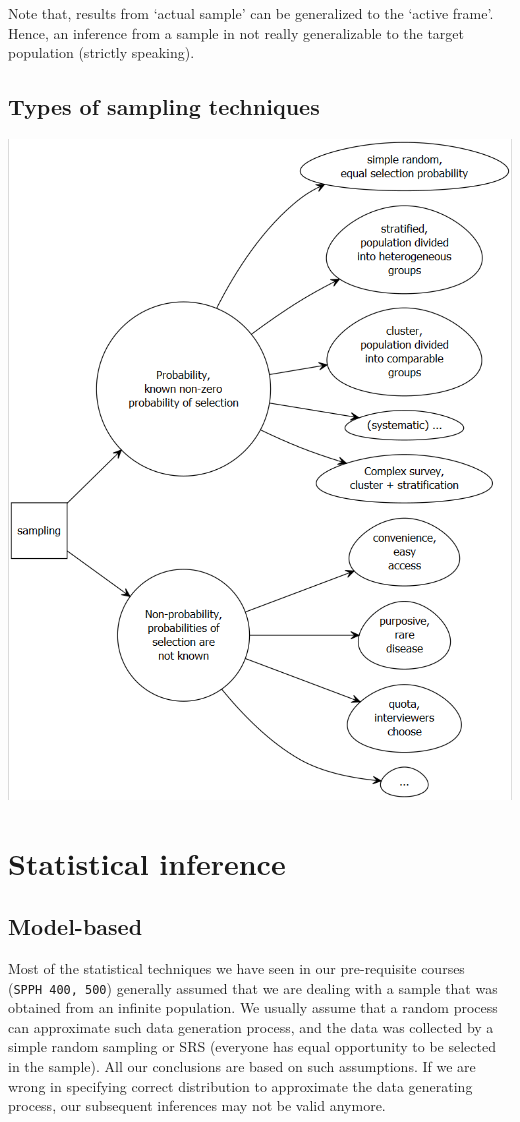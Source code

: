 \documentclass[
]{book}
\begin{document}
Note that, results from `actual sample' can be generalized to the `active frame'. Hence, an inference from a sample in not really generalizable to the target population (strictly speaking).

\hypertarget{types-of-sampling-techniques}{%
\subsection{Types of sampling techniques}\label{types-of-sampling-techniques}}

\includegraphics[width=0.85\linewidth]{images/sampling1}

\hypertarget{statistical-inference}{%
\section{Statistical inference}\label{statistical-inference}}

\hypertarget{model-based}{%
\subsection{Model-based}\label{model-based}}

Most of the statistical techniques we have seen in our pre-requisite courses (\texttt{SPPH\ 400,\ 500}) generally assumed that we are dealing with a sample that was obtained from an infinite population. We usually assume that a random process can approximate such data generation process, and the data was collected by a simple random sampling or SRS (everyone has equal opportunity to be selected in the sample). All our conclusions are based on such assumptions. If we are wrong in specifying correct distribution to approximate the data generating process, our subsequent inferences may not be valid anymore.
\end{document}
